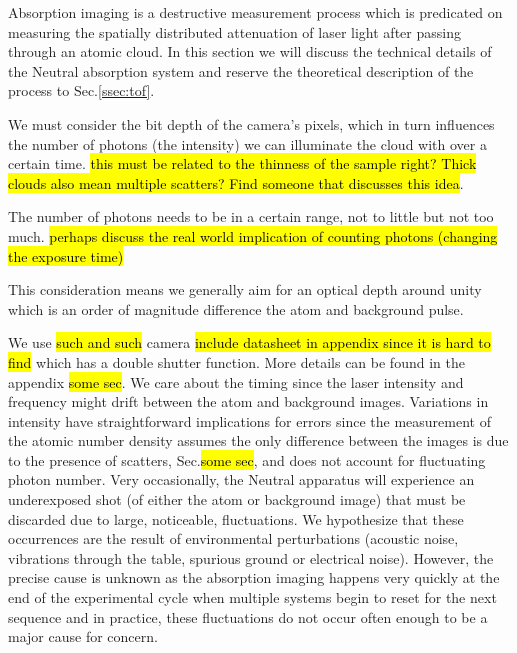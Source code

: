 Absorption imaging is a destructive measurement process which is predicated on measuring the spatially distributed attenuation of laser light after passing through an atomic cloud. In this section we will discuss the technical details of the Neutral absorption system and reserve the theoretical description of the process to Sec.\ref{ssec:tof}. 

We must consider the bit depth of the camera's pixels, which in turn influences the number of photons (the intensity) we can illuminate the cloud with over a certain time. \hl{this must be related to the thinness of the sample right? Thick clouds also mean multiple scatters? Find someone that discusses this idea}.
 
The number of photons needs to be in a certain range, not to little but not too much. \hl{perhaps discuss the real world implication of counting photons (changing the exposure time)} 

This consideration means we generally aim for an optical depth around unity which is an order of magnitude difference the atom and background pulse. 

We use \hl{such and such} camera \hl{include datasheet in appendix since it is hard to find} which has a double shutter function. More details can be found in the appendix \hl{some sec}. We care about the timing since the laser intensity and frequency might drift between the atom and background images. Variations in intensity have straightforward implications for errors since the measurement of the atomic number density assumes the only difference between the images is due to the presence of scatters, Sec.\hl{some sec}, and does not account for fluctuating photon number. Very occasionally, the Neutral apparatus will experience an underexposed shot (of either the atom or background image) that must be discarded due to large, noticeable, fluctuations. We hypothesize that these occurrences are the result of environmental perturbations (acoustic noise, vibrations through the table, spurious ground or electrical noise). However, the precise cause is unknown as the absorption imaging happens very quickly at the end of the experimental cycle when multiple systems begin to reset for the next sequence and in practice, these fluctuations do not occur often enough to be a major cause for concern.

